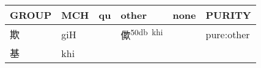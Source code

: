 \documentclass[14pt,a4paper]{scrartcl}
\begin{document}
\begin{longtable}[c]{@{}llllll@{}}
\toprule
\begin{minipage}[b]{0.14\columnwidth}\raggedright\strut
GROUP
\strut\end{minipage} &
\begin{minipage}[b]{0.14\columnwidth}\raggedright\strut
MCH
\strut\end{minipage} &
\begin{minipage}[b]{0.14\columnwidth}\raggedright\strut
qu
\strut\end{minipage} &
\begin{minipage}[b]{0.14\columnwidth}\raggedright\strut
other
\strut\end{minipage} &
\begin{minipage}[b]{0.14\columnwidth}\raggedright\strut
none
\strut\end{minipage} &
\begin{minipage}[b]{0.14\columnwidth}\raggedright\strut
PURITY
\strut\end{minipage}\tabularnewline
\midrule
\endhead
\begin{minipage}[t]{0.14\columnwidth}\raggedright\strut
欺
\strut\end{minipage} &
\begin{minipage}[t]{0.14\columnwidth}\raggedright\strut
giH
\strut\end{minipage} &
\begin{minipage}[t]{0.14\columnwidth}\raggedright\strut
\strut\end{minipage} &
\begin{minipage}[t]{0.14\columnwidth}\raggedright\strut
僛\textsuperscript{50db~khi}
\strut\end{minipage} &
\begin{minipage}[t]{0.14\columnwidth}\raggedright\strut
\strut\end{minipage} &
\begin{minipage}[t]{0.14\columnwidth}\raggedright\strut
pure:other
\strut\end{minipage}\tabularnewline
\begin{minipage}[t]{0.14\columnwidth}\raggedright\strut
基
\strut\end{minipage} &
\begin{minipage}[t]{0.14\columnwidth}\raggedright\strut
khi
\strut\end{minipage} &
\begin{minipage}[t]{0.14\columnwidth}\raggedright\strut
\strut\end{minipage} &
\begin{minipage}[t]{0.14\columnwidth}\raggedright\strut

\end{minipage}
\end{longtable}
\end{document}
